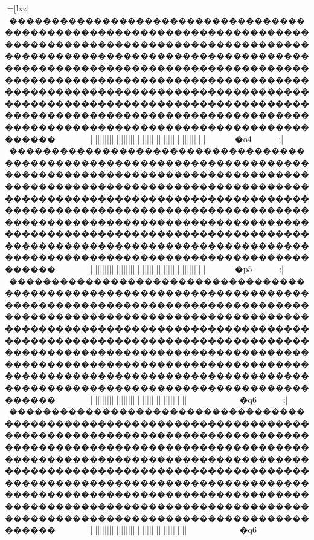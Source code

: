 {{{{{{{{{{{{{{{{{{{{{{{{{{{{{{{{{{{{{{{{{{{{{{{{{{{{{{{{{{{{{{{{{{{{{{{{{{{{{{{{{{{{{{{{{{{{{{{{{{{{{{{{{{{{{{{{{{{{{{{{{{{{{{{{{{{{{{{{{{{{{{{{{{{{{{{{{{{{{{{{{{{{{{{{{{{{{{{{{{{{{{{{{{{{{{{{{{{{{{{{{{{{{{{{{{{{{{{{{{{{{{{{{{{{{{{{{{{{{{{{{{{{{{{{{{{{{{{{{{{{{{{{{{{{{{{{{{{{{{{{{{{{{{{{{{{{{{{{{{{{{{{{{{{{{{{{{{{{{{{{{{{{{{{{{{{{{{{{{{{{{{{{{{{{{{{{{{{{{{{{{{{{{{{{{{{{{{{{{{{{{{{{{{{{{{{{{{{{{{{{{{{{{{{{{{{{{{{{{{{{{{{{{{{{{{{{{{{{{{{{{{{{{{{{{{{{{{{{{{{{{{{{{{{{{{{{{{{{{{{{{{{{{{{{{{{{{{{{{{{{{{{{{{{{{{{{{{{{{{{{{{{{{{{{{{{{{{{{{{{{{{{{{{{{{{{{{{{{{{{{{{{{{{{{{{{{{{{{{{{{{{{{{{{{{{{{{{{{{{{{{{{{{{{{{{{{{{{{{{{{{{{{{{{{{{{{{{=[lxz|}}}~�����������������������������������������������������������������������������������������������������������������������������������������������������������������������������������������������������������������������������������������������������������������������������������������������������������������������������������������������������������������������������~~~~~~||||||||||||||||||||||||||||||||||||||||||||||{{{{{{{{||||}}}}}}}}}}}}}}~~~�o4

;\lxz|}}}~�����������������������������������������������������������������������������������������������������������������������������������������������������������������������������������������������������������������������������������������������������������������������������������������������������������������������������������������������������������������������������~~~~~~||||||||||||||||||||||||||||||||||||||||||||||{{{{{{{{||||}}}}}}}}}}}}}}~~~�p5

:\lxz|}}}~�����������������������������������������������������������������������������������������������������������������������������������������������������������������������������������������������������������������������������������������������������������������������������������������������������������������������������������������������������������������������������~~~~~~||||||||||||||||||{{{{{{{{||||||||||||||||}}}}||||||||}}}}}}}}}}}}~~~~~~~~�q6
:\lxz|}}}~�����������������������������������������������������������������������������������������������������������������������������������������������������������������������������������������������������������������������������������������������������������������������������������������������������������������������������������������������������������������������������~~~~~~||||||||||||||||||{{{{{{{{||||||||||||||||}}}}||||||||}}}}}}}}}}}}~~~~~~~~�q6
}}}}}}}}}}}}}}}}}}}}}}}}}}}}}}}}}}}}}}}}}}}}}}}}}}}}}}}}}}}}}}}}}}}}}}}}}}}}}}}}}}}}}}}}}}}}}}}}}}}}}}}}}}}}}}}}}}}}}}}}}}}}}}}}}}}}}}}}}}}}}}}}}}}}}}}}}}}}}}}}}}}}}}}}}}}}}}}}}}}}}}}}}}}}}}}}}}}}}}}}}}}}}}}}}}}}}}}}}}}}}}}}}}}}}}}}}}}}}}}}}}}}}}}}}}}}}}}}}}}}}}}}}}}}}}}}}}}}}}}}}}}}}}}}}}}}}}}}}}}}}}}}}}}}}}}}}}}}}}}}}}}}}}}}}}}}}}}}}}}}}}}}}}}}}}}}}}}}}}}}}}}}}}}}}}}}}}}}}}}}}}}}}}}}}}}}}}}}}}}}}}}}}}}}}}}}}}}}}}}}}}}}}}}}}}}}}}}}}}}}}}}}}}}}}}}}}}}}}}}}}}}}}}}}}}}}}}}}}}}}}}}}}}}}}}}}}}}}}}}}}}}}}}}}}}}}}}}}}}}}}}}}}}}}}}}}}}}}}}}}}}}}}}}}}}}}}}}}}}}}}}}}}}}}}}}}}}}}}}}}}}}}}}}}}}}}}}
